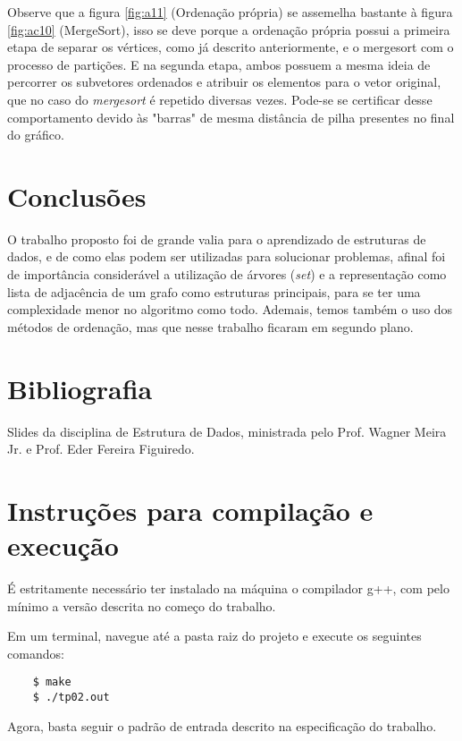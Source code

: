 \documentclass{article}
\begin{document}
Observe que a figura \ref{fig:a11} (Ordenação própria) se assemelha bastante à figura \ref{fig:ac10} (MergeSort), isso se deve porque a ordenação própria possui a primeira etapa de separar os vértices, como já descrito anteriormente, e o mergesort com o processo de partições. 
E na segunda etapa, ambos possuem a mesma ideia de percorrer os subvetores ordenados e atribuir os elementos para o vetor original, que no caso do \emph{mergesort} é repetido diversas vezes. Pode-se se certificar desse comportamento devido às "barras" de mesma distância de pilha presentes no final do gráfico. 


\section{Conclusões}

O trabalho proposto foi de grande valia para o aprendizado de estruturas de dados, e de como elas podem ser utilizadas para solucionar problemas, afinal foi de importância considerável a utilização de árvores (\emph{set}) e a representação como lista de adjacência de um grafo como estruturas principais, para se ter uma complexidade menor no algoritmo como todo. Ademais, temos também o uso dos métodos de ordenação, mas que nesse trabalho ficaram em segundo plano.


\section*{Bibliografia}

Slides da disciplina de Estrutura de Dados, ministrada pelo Prof. Wagner Meira Jr. e Prof. Eder Fereira Figuiredo.


\section*{Instruções para compilação e execução}

É estritamente necessário ter instalado na máquina o compilador g++, com pelo mínimo a versão descrita no começo do trabalho.  

Em um terminal, navegue até a pasta raiz do projeto e execute os seguintes comandos:

\begin{verbatim}
    $ make
    $ ./tp02.out

\end{verbatim}

Agora, basta seguir o padrão de entrada descrito na especificação do trabalho.
\end{document}
